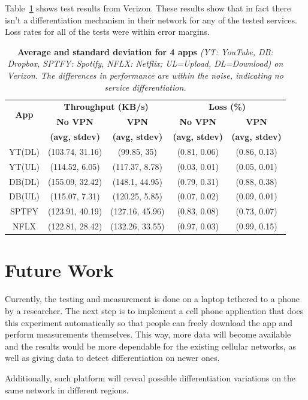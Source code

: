\documentclass[letterpaper]{sig-alternate-10pt}
\begin{document}
Table~\ref{tab:svcdiff} shows test results from Verizon. These results show that in fact there isn't a differentiation mechanism in their network for any of the tested services. Loss rates for all of the tests were within error margins.
\begin{table}
\centering
\begin{small}
\setlength{\tabcolsep}{.01em}
\begin{tabular}{|c|c|c|c|c|}
\hline
\multirow{2}{*}{\bf App}&\multicolumn{2}{c|}{\bf Throughput (KB/s)}& \multicolumn{2}{c|}{\bf Loss (\%)} \tabularnewline
\cline{2-5}
                             &{\bf No VPN} &{\bf VPN}&{\bf No VPN}&{\bf VPN}   \tabularnewline
                             &{\bf (avg, stdev)} &{\bf (avg, stdev)}&{\bf (avg, stdev)}&{\bf (avg, stdev)}   \tabularnewline
\hline

YT(DL)&(103.74, 31.16)&(99.85, 35)&(0.81, 0.06)&(0.86, 0.13) \tabularnewline
\hline
YT(UL)&(114.52, 6.05)&(117.37, 8.78)&(0.03, 0.01)&(0.05, 0.01) \tabularnewline
\hline
DB(DL) &(155.09, 32.42)&(148.1, 44.95)&(0.79, 0.31)&(0.88, 0.38) \tabularnewline
\hline
DB(UL)&(115.07, 7.31)&(120.25, 5.85)&(0.07, 0.02)&(0.09, 0.01) \tabularnewline
\hline
SPTFY&(123.91, 40.19)&(127.16, 45.96)&(0.83, 0.08)&(0.73, 0.07) \tabularnewline
\hline
NFLX&(122.81, 28.42)&(132.26, 33.55)&(0.97, 0.03)&(0.99, 0.15) \tabularnewline
\hline
\end{tabular}
\end{small}
\caption{ \textbf{Average and standard deviation for 4  apps } \emph{(YT: YouTube, DB: Dropbox, SPTFY: Spotify, NFLX: Netflix; UL=Upload, DL=Download) on 
Verizon. The differences in performance are within the noise, indicating no service differentiation. }}
\label{tab:svcdiff}
\end{table}

\section{Future Work}

Currently, the testing and measurement is done on a laptop tethered to a phone by a researcher. The next step is to implement a cell phone application that does this experiment automatically so that people can freely download the app and perform measurements themselves. This way, more data will become available and the results would be more dependable for the existing cellular networks, as well as giving data to detect differentiation on newer ones.

Additionally, such platform will reveal possible differentiation variations on the same network in different regions.

\begin{small}

\end{small}
\end{document}
